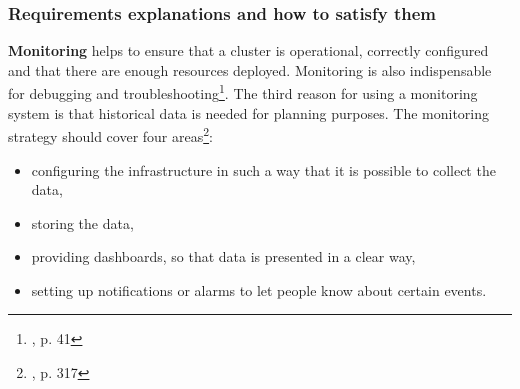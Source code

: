 \subsubsection{Requirements explanations and how to satisfy them}
\textbf{Monitoring} helps to ensure that a cluster is operational, correctly configured and that there are enough resources deployed. Monitoring is also indispensable for debugging and troubleshooting\footnote{\cite{book-mastering-k8s}, p. 41}. The third reason for using a monitoring system is that historical data is needed for planning purposes. The monitoring strategy should cover four areas\footnote{\cite{book-cicd}, p. 317}:
\begin{itemize}
\item configuring the infrastructure in such a way that it is possible to collect the data,
\item storing the data,
\item providing dashboards, so that data is presented in a clear way,
\item setting up notifications or alarms to let people know about certain events.
\end{itemize}
